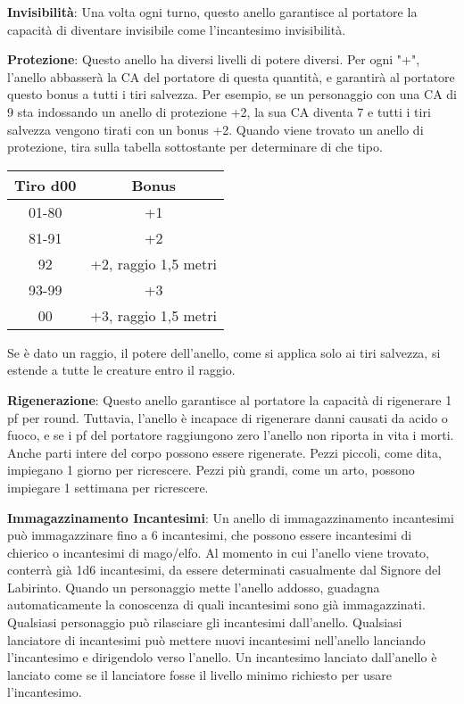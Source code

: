 \documentclass{article}
\begin{document}
\begin{multicols}{2}
\textbf{Invisibilità}: Una volta ogni turno, questo anello garantisce al portatore la capacità di diventare invisibile come l'incantesimo invisibilità.

\textbf{Protezione}: Questo anello ha diversi livelli di potere diversi. Per ogni "+", l'anello abbasserà la CA del portatore di questa quantità, e garantirà al portatore questo bonus a tutti i tiri salvezza. Per esempio, se un personaggio con una CA di 9 sta indossando un anello di protezione +2, la sua CA diventa 7 e tutti i tiri salvezza vengono tirati con un bonus +2. Quando viene trovato un anello di protezione, tira sulla tabella sottostante per determinare di che tipo.

\begin{table}[h]
\centering
\begin{tabular}{|c|c|}
\hline
\textbf{Tiro d00} & \textbf{Bonus} \\
\hline
01-80 & +1 \\
81-91 & +2 \\
92 & +2, raggio 1,5 metri \\
93-99 & +3 \\
00 & +3, raggio 1,5 metri \\
\hline
\end{tabular}

\end{table}

Se è dato un raggio, il potere dell'anello, come si applica solo ai tiri salvezza, si estende a tutte le creature entro il raggio.

\textbf{Rigenerazione}: Questo anello garantisce al portatore la capacità di rigenerare 1 pf per round. Tuttavia, l'anello è incapace di rigenerare danni causati da acido o fuoco, e se i pf del portatore raggiungono zero l'anello non riporta in vita i morti. Anche parti intere del corpo possono essere rigenerate. Pezzi piccoli, come dita, impiegano 1 giorno per ricrescere. Pezzi più grandi, come un arto, possono impiegare 1 settimana per ricrescere.

\textbf{Immagazzinamento Incantesimi}: Un anello di immagazzinamento incantesimi può immagazzinare fino a 6 incantesimi, che possono essere incantesimi di chierico o incantesimi di mago/elfo. Al momento in cui l'anello viene trovato, conterrà già 1d6 incantesimi, da essere determinati casualmente dal Signore del Labirinto. Quando un personaggio mette l'anello addosso, guadagna automaticamente la conoscenza di quali incantesimi sono già immagazzinati. Qualsiasi personaggio può rilasciare gli incantesimi dall'anello. Qualsiasi lanciatore di incantesimi può mettere nuovi incantesimi nell'anello lanciando l'incantesimo e dirigendolo verso l'anello. Un incantesimo lanciato dall'anello è lanciato come se il lanciatore fosse il livello minimo richiesto per usare l'incantesimo.


\end{multicols}
\end{document}
